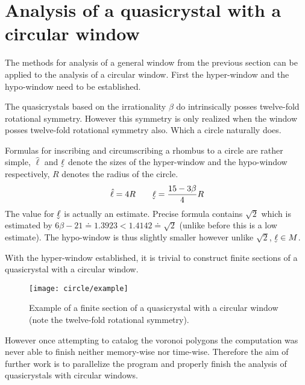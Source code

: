 \documentclass[text.tex]{subfiles}
\begin{document}
\section{Analysis of a quasicrystal with a circular window}
The methods for analysis of a general window from the previous section can be applied to the analysis of a circular window. First the hyper-window and the hypo-window need to be established. 

The quasicrystals based on the irrationality $\beta$ do intrinsically posses twelve-fold rotational symmetry. However this symmetry is only realized when the window posses twelve-fold rotational symmetry also. Which a circle naturally does. 

Formulas for inscribing and circumscribing a rhombus to a circle are rather simple, $\hat{\ell}$ and $\uhat{\ell}$ denote the sizes of the hyper-window and the hypo-window respectively, $R$ denotes the radius of the circle. 
$$\hat{\ell} = 4R \qquad \uhat{\ell} = \frac{15-3\beta}{4}R$$
The value for $\uhat{\ell}$ is actually an estimate. Precise formula contains $\sqrt{2}$ which is estimated by $6\beta - 21 \doteq 1.3923 < 1.4142 \doteq \sqrt{2}$ (unlike before this is a low estimate). The hypo-window is thus slightly smaller however unlike $\sqrt{2}$, $\uhat{\ell}\in M$.

With the hyper-window established, it is trivial to construct finite sections of a quasicrystal with a circular window. 

\begin{figure}[h!]
\centering
\texttt{[image: circle/example]}
\caption{Example of a finite section of a quasicrystal with a circular window (note the twelve-fold rotational symmetry).}
\end{figure}

However once attempting to catalog the voronoi polygons the computation was never able to finish neither memory-wise nor time-wise. Therefore the aim of further work is to parallelize the program and properly finish the analysis of quasicrystals with circular windows. 
\end{document}
